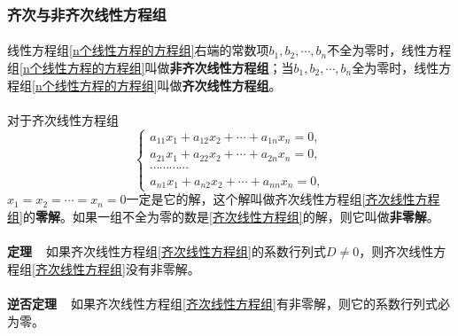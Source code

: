 \subsubsection{齐次与非齐次线性方程组}
\paragraph{}
线性方程组\eqref{n个线性方程的方程组}右端的常数项$b_1,b_2,\cdots,b_n$不全为零时，线性方程组\eqref{n个线性方程的方程组}叫做\textbf{非齐次线性方程组}；当$b_1,b_2,\cdots,b_n$全为零时，线性方程组\eqref{n个线性方程的方程组}叫做\textbf{齐次线性方程组}。

\paragraph{}
对于齐次线性方程组
\begin{equation}
  \label{齐次线性方程组}
  \left\{\begin{array}{l}
    a_{11}x_1 + a_{12}x_2 + \cdots + a_{1n}x_n = 0, \\
    a_{21}x_1 + a_{22}x_2 + \cdots + a_{2n}x_n = 0, \\
    \cdots\cdots\cdots\cdots \\
    a_{n1}x_1 + a_{n2}x_2 + \cdots + a_{nn}x_n = 0,
  \end{array} \right.
\end{equation}
$x_1=x_2=\cdots=x_n=0$一定是它的解，这个解叫做齐次线性方程组\eqref{齐次线性方程组}的\textbf{零解}。如果一组不全为零的数是\eqref{齐次线性方程组}的解，则它叫做\textbf{非零解}。

\paragraph{}
\textbf{定理~~}如果齐次线性方程组\eqref{齐次线性方程组}的系数行列式$D\neq 0$，则齐次线性方程组\eqref{齐次线性方程组}没有非零解。

\paragraph{}
\textbf{逆否定理~~}如果齐次线性方程组\eqref{齐次线性方程组}有非零解，则它的系数行列式必为零。
